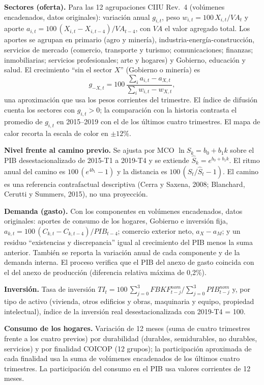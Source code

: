 \textbf{Sectores (oferta).} Para las 12 agrupaciones CIIU Rev.~4
(volúmenes encadenados, datos originales): variación anual \(g_{i,t}\),
peso \(w_{i,t}=100\,X_{i,t}/VA_t\) y aporte
\(a_{i,t}=100\,(X_{i,t}-X_{i,t-4})/VA_{t-4}\), con \(VA\) el valor
agregado total. Los aportes se agrupan en primario (agro y minería),
industria-energía-construcción, servicios de mercado (comercio,
transporte y turismo; comunicaciones; finanzas; inmobiliarias; servicios
profesionales; arte y hogares) y Gobierno, educación y salud. El
crecimiento ``sin el sector \(X\)'' (Gobierno o minería) es
\[g_{-X,t}=100\,\frac{\sum_i a_{i,t}-a_{X,t}}{\sum_i w_{i,t}-w_{X,t}},\]
una aproximación que usa los pesos corrientes del trimestre. El índice
de difusión cuenta los sectores con \(g_{i,t}>0\); la comparación con la
historia contrasta el promedio de \(g_{i,t}\) en 2015--2019 con el de
los últimos cuatro trimestres. El mapa de calor recorta la escala de
color en \(\pm 12\%\).

\textbf{Nivel frente al camino previo.} Se ajusta por MCO
\(\ln S_k = b_0+b_1 k\) sobre el PIB desestacionalizado de 2015-T1 a
2019-T4 y se extiende \(\hat S_k=e^{b_0+b_1k}\). El ritmo anual del
camino es \(100\,(e^{4b_1}-1)\) y la distancia es
\(100\,(S_t/\hat S_t-1)\). El camino es una referencia contrafactual
descriptiva (Cerra y Saxena, 2008; Blanchard, Cerutti y Summers, 2015),
no una proyección.

\textbf{Demanda (gasto).} Con los componentes en volúmenes encadenados,
datos originales: aportes de consumo de los hogares, Gobierno e
inversión fija, \(a_{k,t}=100\,(C_{k,t}-C_{k,t-4})/PIB_{t-4}\); comercio
exterior neto, \(a_X-a_M\); y un residuo ``existencias y discrepancia''
igual al crecimiento del PIB menos la suma anterior. También se reporta
la variación anual de cada componente y de la demanda interna. El
proceso verifica que el PIB del anexo de gasto coincida con el del anexo
de producción (diferencia relativa máxima de 0,2\%).

\textbf{Inversión.} Tasa de inversión
\(TI_t=100\,\sum_{j=0}^{3}FBKF^{nom}_{t-j}/\sum_{j=0}^{3}PIB^{nom}_{t-j}\)
y, por tipo de activo (vivienda, otros edificios y obras, maquinaria y
equipo, propiedad intelectual), índice de la inversión real
desestacionalizada con 2019-T4 = 100.

\textbf{Consumo de los hogares.} Variación de 12 meses (suma de cuatro
trimestres frente a los cuatro previos) por durabilidad (durables,
semidurables, no durables, servicios) y por finalidad COICOP (12
grupos); la participación aproximada de cada finalidad usa la suma de
volúmenes encadenados de los últimos cuatro trimestres. La participación
del consumo en el PIB usa valores corrientes de 12 meses.

